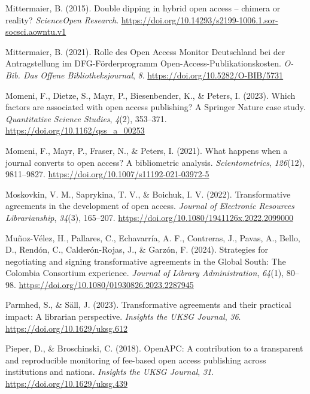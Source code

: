 \documentclass[a4paper,man,floatsintext,longtable,noextraspace,12pt]{apa6}
\newenvironment{CSLReferences}%
  {}%
  {\par}
\begin{document}
\begin{CSLReferences}{1}{0}
\leavevmode{}%
Mittermaier, B. (2015). Double dipping in hybrid open access -- chimera
or reality? \emph{{ScienceOpen} Research}.
\url{https://doi.org/10.14293/s2199-1006.1.sor-socsci.aowntu.v1}

\leavevmode{}%
Mittermaier, B. (2021). {Rolle des Open Access Monitor Deutschland bei
der Antragstellung im DFG-Förderprogramm
Open-Access-Publikationskosten}. \emph{{O-Bib. Das Offene
Bibliotheksjournal}}, \emph{8}. \url{https://doi.org/10.5282/O-BIB/5731}

\leavevmode{}%
Momeni, F., Dietze, S., Mayr, P., Biesenbender, K., \& Peters, I.
(2023). Which factors are associated with open access publishing? A
{Springer Nature} case study. \emph{Quantitative Science Studies},
\emph{4}(2), 353--371. \url{https://doi.org/10.1162/qss_a_00253}

\leavevmode{}%
Momeni, F., Mayr, P., Fraser, N., \& Peters, I. (2021). What happens
when a journal converts to open access? A bibliometric analysis.
\emph{Scientometrics}, \emph{126}(12), 9811--9827.
\url{https://doi.org/10.1007/s11192-021-03972-5}

\leavevmode{}%
Moskovkin, V. M., Saprykina, T. V., \& Boichuk, I. V. (2022).
Transformative agreements in the development of open access.
\emph{Journal of Electronic Resources Librarianship}, \emph{34}(3),
165--207. \url{https://doi.org/10.1080/1941126x.2022.2099000}

\leavevmode{}%
Muñoz-Vélez, H., Pallares, C., Echavarría, A. F., Contreras, J., Pavas,
A., Bello, D., Rendón, C., Calderón-Rojas, J., \& Garzón, F. (2024).
Strategies for negotiating and signing transformative agreements in the
{Global South}: The {Colombia Consortium} experience. \emph{Journal of
Library Administration}, \emph{64}(1), 80--98.
\url{https://doi.org/10.1080/01930826.2023.2287945}

\leavevmode{}%
Parmhed, S., \& Säll, J. (2023). Transformative agreements and their
practical impact: A librarian perspective. \emph{Insights the UKSG
Journal}, \emph{36}. \url{https://doi.org/10.1629/uksg.612}

\leavevmode{}%
Pieper, D., \& Broschinski, C. (2018). {OpenAPC}: A contribution to a
transparent and reproducible monitoring of fee-based open access
publishing across institutions and nations. \emph{Insights the {UKSG}
Journal}, \emph{31}. \url{https://doi.org/10.1629/uksg.439}


\end{CSLReferences}
\end{document}
